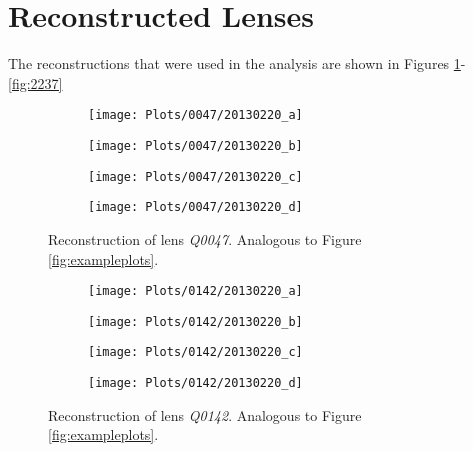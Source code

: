 \documentclass[10pt]{article}
\begin{document}

\clearpage
\appendix
\section{Reconstructed Lenses}\label{sec:reconstructions}

The reconstructions that were used in the analysis are shown in Figures \ref{fig:47}-\ref{fig:2237}

\begin{figure}[ht!]
 \centering
 \begin{subfigure}{.48\textwidth}
  \centering
  \texttt{[image: Plots/0047/20130220\_a]}
  \caption{}
 \end{subfigure}
 \begin{subfigure}{.48\textwidth}
  \centering
  \texttt{[image: Plots/0047/20130220\_b]}
  \caption{}
 \end{subfigure}
 
 \begin{subfigure}{.48\textwidth}
  \centering
  \texttt{[image: Plots/0047/20130220\_c]}
  \caption{}
 \end{subfigure}
 \begin{subfigure}{.48\textwidth}
  \centering
  \texttt{[image: Plots/0047/20130220\_d]}
  \caption{}
 \end{subfigure}
 \captionsetup{width=.93\textwidth}
 \caption{Reconstruction of lens \textit{Q0047}. Analogous to Figure \ref{fig:exampleplots}.}
 \label{fig:47}
\end{figure}

\begin{figure}[ht!]
 \centering
 \begin{subfigure}{.48\textwidth}
  \centering
  \texttt{[image: Plots/0142/20130220\_a]}
  \caption{}
 \end{subfigure}
 \begin{subfigure}{.48\textwidth}
  \centering
  \texttt{[image: Plots/0142/20130220\_b]}
  \caption{}
 \end{subfigure}
 
 \begin{subfigure}{.48\textwidth}
  \centering
  \texttt{[image: Plots/0142/20130220\_c]}
  \caption{}
 \end{subfigure}
 \begin{subfigure}{.48\textwidth}
  \centering
  \texttt{[image: Plots/0142/20130220\_d]}
  \caption{}
 \end{subfigure}
 \captionsetup{width=.93\textwidth}
 \caption{Reconstruction of lens \textit{Q0142}. Analogous to Figure \ref{fig:exampleplots}.}
 \label{fig:142}
\end{figure}
\end{document}
